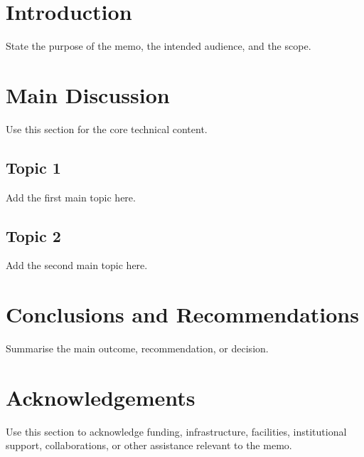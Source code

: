 \documentclass{uksrc-memo}
\begin{document}
\uksrcstandardfrontmatter

\section{Introduction}

State the purpose of the memo, the intended audience, and the scope.

\section{Main Discussion}

Use this section for the core technical content.

\subsection{Topic 1}

Add the first main topic here.

\subsection{Topic 2}

Add the second main topic here.

\section{Conclusions and Recommendations}

Summarise the main outcome, recommendation, or decision.


\section*{Acknowledgements}

Use this section to acknowledge funding, infrastructure, facilities, institutional support, collaborations, or other assistance relevant to the memo.



% 
% 
\end{document}

